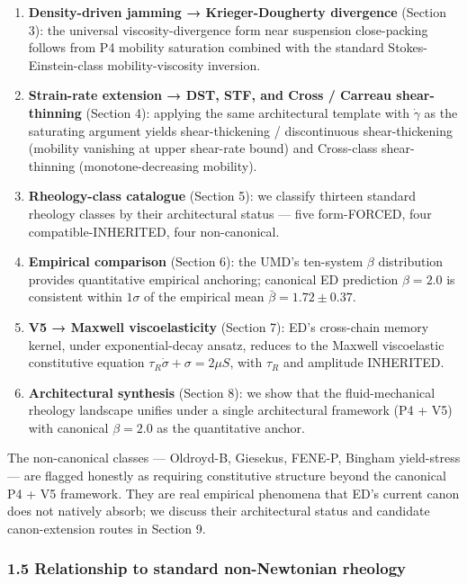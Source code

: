 \documentclass[
  11pt,a4paper]{article}
\begin{document}
\begin{enumerate}
\def\labelenumi{\arabic{enumi}.}
\item
  \textbf{Density-driven jamming → Krieger-Dougherty divergence}
  (Section 3): the universal viscosity-divergence form near suspension
  close-packing follows from P4 mobility saturation combined with the
  standard Stokes-Einstein-class mobility-viscosity inversion.
\item
  \textbf{Strain-rate extension → DST, STF, and Cross / Carreau
  shear-thinning} (Section 4): applying the same architectural template
  with \(\dot\gamma\) as the saturating argument yields shear-thickening
  / discontinuous shear-thickening (mobility vanishing at upper
  shear-rate bound) and Cross-class shear-thinning (monotone-decreasing
  mobility).
\item
  \textbf{Rheology-class catalogue} (Section 5): we classify thirteen
  standard rheology classes by their architectural status --- five
  form-FORCED, four compatible-INHERITED, four non-canonical.
\item
  \textbf{Empirical comparison} (Section 6): the UMD's ten-system
  \(\beta\) distribution provides quantitative empirical anchoring;
  canonical ED prediction \(\beta = 2.0\) is consistent within
  \(1\sigma\) of the empirical mean \(\bar\beta = 1.72 \pm 0.37\).
\item
  \textbf{V5 → Maxwell viscoelasticity} (Section 7): ED's cross-chain
  memory kernel, under exponential-decay ansatz, reduces to the Maxwell
  viscoelastic constitutive equation
  \(\tau_R \dot\sigma + \sigma = 2\mu S\), with \(\tau_R\) and amplitude
  INHERITED.
\item
  \textbf{Architectural synthesis} (Section 8): we show that the
  fluid-mechanical rheology landscape unifies under a single
  architectural framework (P4 + V5) with canonical \(\beta = 2.0\) as
  the quantitative anchor.
\end{enumerate}

The non-canonical classes --- Oldroyd-B, Giesekus, FENE-P, Bingham
yield-stress --- are flagged honestly as requiring constitutive
structure beyond the canonical P4 + V5 framework. They are real
empirical phenomena that ED's current canon does not natively absorb; we
discuss their architectural status and candidate canon-extension routes
in Section 9.

\subsubsection{1.5 Relationship to standard non-Newtonian
rheology}\label{relationship-to-standard-non-newtonian-rheology}
\end{document}
